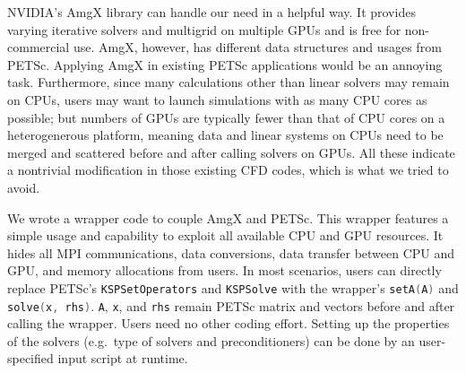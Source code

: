NVIDIA's AmgX library can handle our need in a helpful way.
It provides varying iterative solvers and multigrid on multiple GPUs and is 
free for non-commercial use.
AmgX, however, has different data structures and usages from PETSc.
Applying AmgX in existing PETSc applications would be an annoying task.
Furthermore, since many calculations other than linear solvers may remain on CPUs,
users may want to launch simulations with as many CPU cores as possible;
but numbers of GPUs are typically fewer than that of CPU cores on a 
heterogenerous platform,
meaning data and linear systems on CPUs need to be merged and scattered before 
and after calling solvers on GPUs.
All these indicate a nontrivial modification in those existing CFD codes, 
which is what we tried to avoid.

We wrote a wrapper code to couple AmgX and PETSc. 
This wrapper features a simple usage and capability to exploit all available CPU 
and GPU resources.
It hides all MPI communications, data conversions, data transfer between CPU 
and GPU, and memory allocations from users.
In most scenarios, users can directly replace PETSc's
\lstinline[language=C++, basicstyle=\ttfamily]|KSPSetOperators| and 
\lstinline[language=C++, basicstyle=\ttfamily]|KSPSolve| 
with the wrapper's
\lstinline[language=C++, basicstyle=\ttfamily]|setA(A)| and
\lstinline[language=C++, basicstyle=\ttfamily]|solve(x, rhs)|.
\lstinline[language=C++, basicstyle=\ttfamily]|A|,
\lstinline[language=C++, basicstyle=\ttfamily]|x|, and
\lstinline[language=C++, basicstyle=\ttfamily]|rhs|
remain PETSc matrix and vectors before and after calling the wrapper.
Users need no other coding effort.
Setting up the properties of the solvers (e.g.\ type of solvers and 
preconditioners) can be done by an user-specified input script at runtime.

